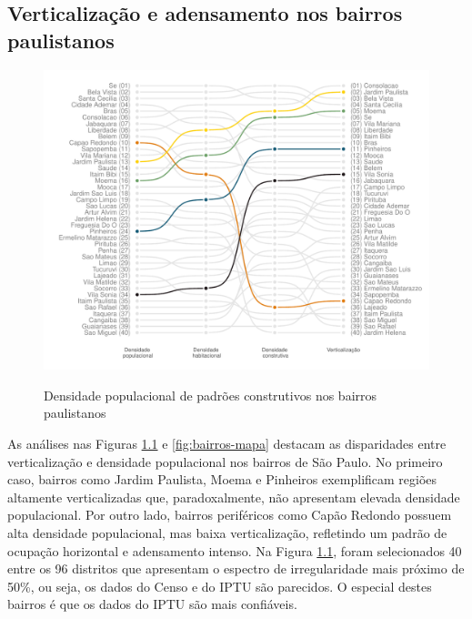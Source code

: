 \begin{apendicesenv}
\chapter{Verticalização e adensamento nos bairros paulistanos}
\label{appendix:bairros}

\begin{figure}[!h]
    \centering
    \caption{Densidade populacional de padrões construtivos nos bairros paulistanos}
    \includegraphics[width = \linewidth]{figuras/bairros.pdf}
    \label{fig:bairros}
\end{figure}


As análises nas Figuras \ref{fig:bairros} e \ref{fig:bairros-mapa} destacam as disparidades entre verticalização e densidade populacional nos bairros de São Paulo. No primeiro caso, bairros como Jardim Paulista, Moema e Pinheiros exemplificam regiões altamente verticalizadas que, paradoxalmente, não apresentam elevada densidade populacional. Por outro lado, bairros periféricos como Capão Redondo possuem alta densidade populacional, mas baixa verticalização, refletindo um padrão de ocupação horizontal e adensamento intenso. Na Figura \ref{fig:bairros}, foram selecionados 40 entre os 96 distritos que apresentam o espectro de irregularidade mais próximo de 50\%, ou seja, os dados do Censo e do IPTU são parecidos. O especial destes bairros é que os dados do IPTU são mais confiáveis.


\end{apendicesenv}
